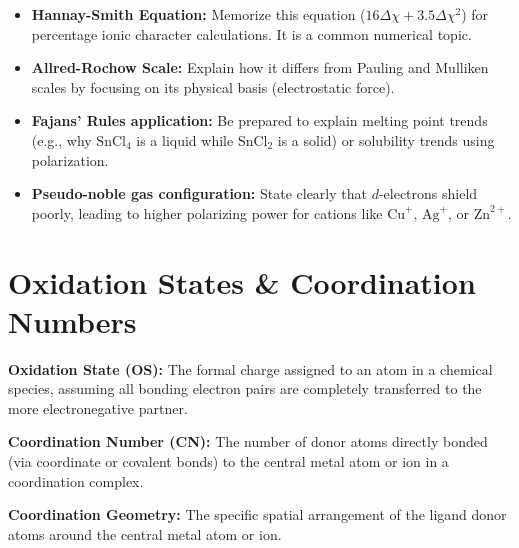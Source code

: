 \documentclass[12pt,a4paper]{article}
\begin{document}
\begin{tcolorbox}[exambox, title={Exam Points: Electronegativity and Fajans' Rules}]
  \begin{itemize}[leftmargin=*, itemsep=2pt, topsep=2pt]
    \item \textbf{Hannay-Smith Equation:} Memorize this equation ($16\Delta\chi + 3.5\Delta\chi^2$) for percentage ionic character calculations. It is a common numerical topic.
    \item \textbf{Allred-Rochow Scale:} Explain how it differs from Pauling and Mulliken scales by focusing on its physical basis (electrostatic force).
    \item \textbf{Fajans' Rules application:} Be prepared to explain melting point trends (e.g., why $\text{SnCl}_4$ is a liquid while $\text{SnCl}_2$ is a solid) or solubility trends using polarization.
    \item \textbf{Pseudo-noble gas configuration:} State clearly that $d$-electrons shield poorly, leading to higher polarizing power for cations like $\text{Cu}^+$, $\text{Ag}^+$, or $\text{Zn}^{2+}$.
  \end{itemize}
\end{tcolorbox}

\section{Oxidation States \& Coordination Numbers}

\begin{tcolorbox}[defbox, title={Definitions: Oxidation States, Coordination Numbers, and Geometries}]
  \textbf{Oxidation State (OS):} The formal charge assigned to an atom in a chemical species, assuming all bonding electron pairs are completely transferred to the more electronegative partner.
  \par\vspace{4pt}
  \textbf{Coordination Number (CN):} The number of donor atoms directly bonded (via coordinate or covalent bonds) to the central metal atom or ion in a coordination complex.
  \par\vspace{4pt}
  \textbf{Coordination Geometry:} The specific spatial arrangement of the ligand donor atoms around the central metal atom or ion.
\end{tcolorbox}
\end{document}
